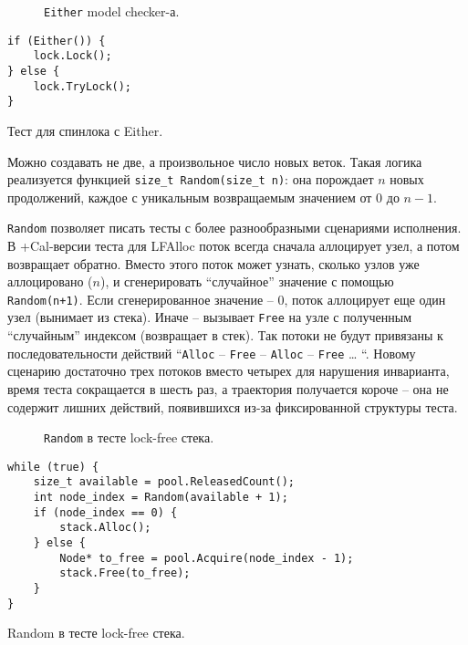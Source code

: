 \begin{figure}
	\bigskip
	\caption{\texttt{Either} model checker-а.}
\end{figure}

\else

\begin{listing}
	\centering
	
	\begin{verbatim}
if (Either()) {
	lock.Lock();
} else {
	lock.TryLock();
}
	\end{verbatim}
	\caption{Тест для спинлока с Either.}
	
\end{listing}

\fi

Можно создавать не две, а произвольное число новых веток. Такая логика реализуется функцией \texttt{size_t Random(size_t n)}: она порождает $n$ новых продолжений, каждое с уникальным возвращаемым значением от $0$ до $n-1$. 

\texttt{Random} позволяет писать тесты с более разнообразными сценариями исполнения. В +Cal-версии теста для LFAlloc поток всегда сначала аллоцирует узел, а потом возвращает обратно. Вместо этого поток может узнать, сколько узлов уже аллоцировано ($n$), и сгенерировать “случайное” значение с помощью \texttt{Random(n+1)}. Если сгенерированное значение – $0$, поток аллоцирует еще один узел (вынимает из стека). Иначе – вызывает \texttt{Free} на узле с полученным “случайным” индексом (возвращает в стек). Так потоки не будут привязаны к последовательности действий “\texttt{Alloc} – \texttt{Free} – \texttt{Alloc} – \texttt{Free} … “. Новому сценарию достаточно трех потоков вместо четырех для нарушения инварианта, время теста сокращается в шесть раз, а траектория получается короче – она не содержит лишних действий, появившихся из-за фиксированной структуры теста.


\begin{figure}
	\bigskip
	\caption{\texttt{Random} в тесте lock-free стека.}
\end{figure}


\else

\begin{listing}
	\centering
	
	\begin{verbatim}
while (true) {
	size_t available = pool.ReleasedCount();
	int node_index = Random(available + 1);
	if (node_index == 0) {
		stack.Alloc();
	} else {
		Node* to_free = pool.Acquire(node_index - 1);
		stack.Free(to_free);
	}
}
	\end{verbatim}
	\caption{Random в тесте lock-free стека.}
	
\end{listing}

